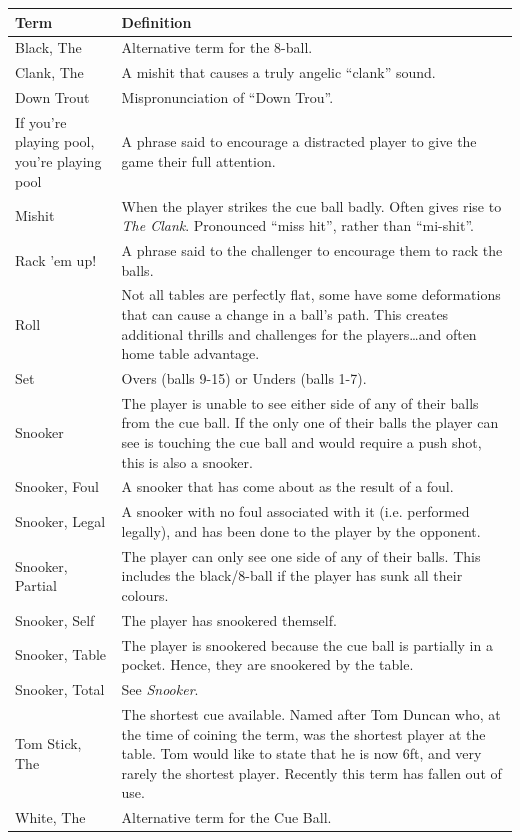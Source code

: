 \documentclass[a4paper, twocolumn]{article}
\begin{document}
\small
\begin{center}
    \begin{tabular}{  p{}  p{}  } 
      \hline
      \textbf{Term} & \textbf{Definition} \\ \hline
      Black, The & Alternative term for the 8-ball. \\ \hline
      Clank, The & A mishit that causes a truly angelic “clank” sound. \\ \hline
      Down Trout & Mispronunciation of “Down Trou”. \\ \hline
      If you're playing pool, you're playing pool & A phrase said to encourage a distracted player to give the game their full attention. \\ \hline
      Mishit & When the player strikes the cue ball badly. Often gives rise to \emph{The Clank}. Pronounced “miss hit”, rather than “mi-shit”.\\ \hline
      Rack 'em up! & A phrase said to the challenger to encourage them to rack the balls. \\ \hline
      Roll & Not all tables are perfectly flat, some have some deformations that can cause a change in a ball's path. This creates additional thrills and challenges for the players\dots and often home table advantage.\\ \hline
      Set & Overs (balls 9-15) or Unders (balls 1-7). \\ \hline
      Snooker & The player is unable to see either side of any of their balls from the cue ball. If the only one of their balls the player can see is touching the cue ball and would require a push shot, this is also a snooker.\\ \hline
      Snooker, Foul & A snooker that has come about as the result of a foul. \\ \hline
      Snooker, Legal & A snooker with no foul associated with it (i.e. performed legally), and has been done to the player by the opponent. \\ \hline
      Snooker, Partial & The player can only see one side of any of their balls. This includes the black/8-ball if the player has sunk all their colours. \\ \hline
      Snooker, Self & The player has snookered themself. \\ \hline
      Snooker, Table & The player is snookered because the cue ball is partially in a pocket. Hence, they are snookered by the table.\\ \hline
      Snooker, Total & See \emph{Snooker}. \\ \hline
      Tom Stick, The & The shortest cue available. Named after Tom Duncan who, at the time of coining the term, was the shortest player at the table. Tom would like to state that he is now 6ft, and very rarely the shortest player. Recently this term has fallen out of use. \\ \hline
      White, The & Alternative term for the Cue Ball. \\ \hline
    \end{tabular}
\end{center}
\normalsize

\newpage
\end{document}
